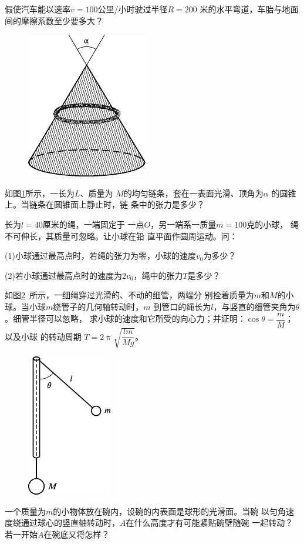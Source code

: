 \begin{exercises}
\exercise 假使汽车能以速率$  v = 1 0 0  $公里/小时驶过半径$  R = 2 0 0  $
米的水平弯道，车胎与地面间的摩擦系数至少要多大？

\begin{figure}
  \centering
  \includegraphics{figure/fig03.33}
  \caption{}
  \label{fig:03.33}
\end{figure}
\exercise 如图\ref{fig:03.33}所示，一长为$ L $、质量为
$ M $的均匀链条，套在一表面光滑、顶角为$ \alpha $
的圆锥上。当链条在圆锥面上静止时，链
条中的张力是多少？

\exercise 长为$  l = 4 0  $厘米的绳，一端固定于
一点$ O $，另一端系一质量$  m = 1 0 0  $克的小球，
绳不可伸长，其质量可忽略。让小球在铅
直平面作圆周运动。问：

(1)小球通过最高点时，若绳的张力为零，小球的速度$  v _ { 0 }  $为多少？

(2)若小球通过最高点时的速度为$  2 v _ { 0 }  $，绳中的张力$ T $是多少？

\exercise 如图\ref{fig:03.34}~所示，一细绳穿过光滑的、不动的细管，两端分
别拴着质量为$ m $和$ M $的小球。当小球$ m $绕管子的几何轴转动时，$ m $
到管口的绳长为$ l $，与竖直的细管夹角为$ \theta $。细管半径可以忽略，
求小球的速度和它所受的向心力；并证明：$  \cos \theta = \dfrac { m } { M }  $； 以及小球
的转动周期
$ T = 2 \uppi \sqrt{\dfrac { l m } { M g }}  $。

\begin{figure}
  \centering
  \includegraphics{figure/fig03.34}
  \caption{}
  \label{fig:03.34}
\end{figure}
\exercise 一个质量为$ m $的小物体放在碗内，设碗的内表面是球形的光滑面。当碗
以匀角速度绕通过球心的竖直轴转动时，$ A $在什么高度才有可能紧贴碗壁随碗
一起转动？若一开始$ A $在碗底又将怎样？


\end{exercises}
